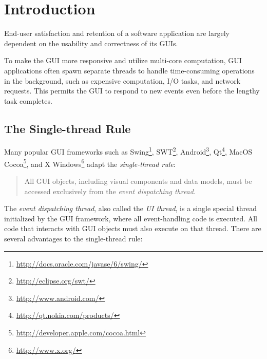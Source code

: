 \section{Introduction}
\label{sec:introduction}

End-user satisfaction and retention of a software application
 are largely dependent on the usability and correctness of
its GUIs.

To make the GUI more responsive and utilize multi-core computation,
GUI applications often spawn separate threads to handle time-consuming
operations in the background, such as expensive computation, I/O tasks,
and network requests. This permits the GUI to respond to new events
even before the lengthy task completes.



\subsection{The Single-thread Rule}

Many popular GUI frameworks such as Swing\footnote{\url{http://docs.oracle.com/javase/6/swing/}},
SWT\footnote{\url{http://eclipse.org/swt/}}, Android\footnote{\url{http://www.android.com/}},
Qt\footnote{\url{http://qt.nokia.com/products/}}, MacOS Cocoa\footnote{\url{http://developer.apple.com/cocoa.html}},
and X Windows\footnote{\url{http://www.x.org/}}
adapt the \textit{single-thread rule}:

\vspace{-2mm}

\begin{quote}
All GUI objects, including visual components and data models, must be
 accessed exclusively from the \textit{event dispatching thread}.
\end{quote}

\vspace{-2mm}

The \textit{event dispatching thread}, also called the \textit{UI thread}, is a single
special thread initialized by the GUI framework, where all event-handling code
is executed. All code that interacts with GUI objects must also
execute on that thread.  There are several advantages to the single-thread rule:

